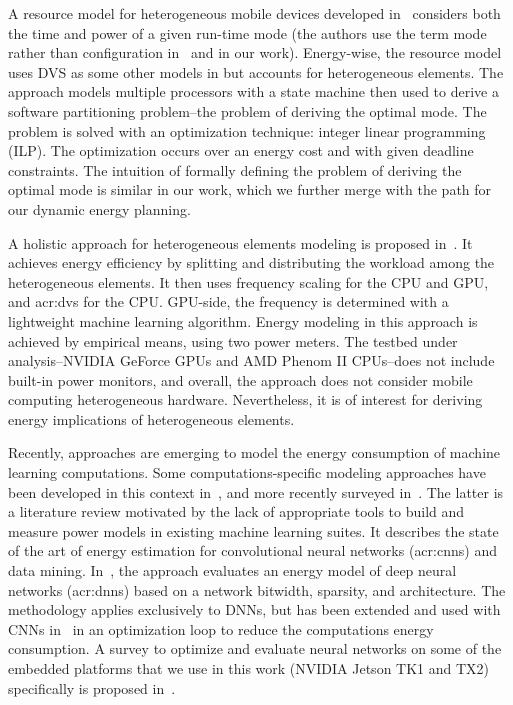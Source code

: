 A resource model for heterogeneous mobile devices developed in~\citep{goraczko2008energy} considers both the time and power of a given run-time mode (the authors use the term mode rather than configuration in~\citep{marowka2017energy,bailey2014adaptive} and in our work). Energy-wise, the resource model uses DVS as some other models in  but accounts for heterogeneous elements. The approach models multiple processors with a state machine then used to derive a software partitioning problem--the problem of deriving the optimal mode. The problem is solved with an optimization technique: integer linear programming (ILP). The optimization occurs over an energy cost and with given deadline constraints. The intuition of formally defining the problem of deriving the optimal mode is similar in our work, which we further merge with the path for our dynamic energy planning.

A holistic approach for heterogeneous elements modeling is proposed in~\citep{ma2012holistic}. It achieves energy efficiency by splitting and distributing the workload among the heterogeneous elements. It then uses frequency scaling for the CPU and GPU, and \Gls{acr:dvs} for the CPU. GPU-side, the frequency is determined with a lightweight machine learning algorithm. Energy modeling in this approach is achieved by empirical means, using two power meters. The testbed under analysis--NVIDIA GeForce GPUs and AMD Phenom II CPUs--does not include built-in power monitors, and overall, the approach does not consider mobile computing heterogeneous hardware. Nevertheless, it is of interest for deriving energy implications of heterogeneous elements.

Recently, approaches are emerging to model the energy consumption of machine learning computations.
Some computations-specific modeling approaches have been developed in this context in~\citep{yang2017method}, and more recently surveyed in~\citep{garcia2019estimation}. The latter is a literature review motivated by the lack of appropriate tools to build and measure power models in existing machine learning suites. It describes the state of the art of energy estimation for convolutional neural networks (\Gls{acr:cnn}s) and data mining. In~\citep{yang2017method}, the approach evaluates an energy model of deep neural networks (\Gls{acr:dnn}s) based on a network bitwidth, sparsity, and architecture. The methodology applies exclusively to DNNs, but has been extended and used with CNNs in~\citep{yang2017designing} in an optimization loop to reduce the computations energy consumption. A survey to optimize and evaluate neural networks on some of the embedded platforms that we use in this work (NVIDIA Jetson TK1 and TX2) specifically is proposed in~\citep{mittal2019survey}. 


